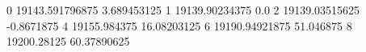 0 19143.591796875 3.689453125
1 19139.90234375 0.0
2 19139.03515625 -0.8671875
4 19155.984375 16.08203125
6 19190.94921875 51.046875
8 19200.28125 60.37890625
